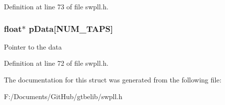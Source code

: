 Definition at line 73 of file swpll.\+h.

\hypertarget{structfir_inst_aa21e5782bc05c93169c05e3482a44e1d}{
\subsubsection[{p\+Data}]{\setlength{\rightskip}{0pt plus 5cm}float$\ast$ p\+Data\mbox{[}N\+U\+M\+\_\+\+T\+A\+P\+S\mbox{]}}}\label{structfir_inst_aa21e5782bc05c93169c05e3482a44e1d}
Pointer to the data 

Definition at line 72 of file swpll.\+h.



The documentation for this struct was generated from the following file\+:\begin{DoxyCompactItemize}
\item 
F\+:/\+Documents/\+Git\+Hub/gtbelib/swpll.\+h\end{DoxyCompactItemize}
